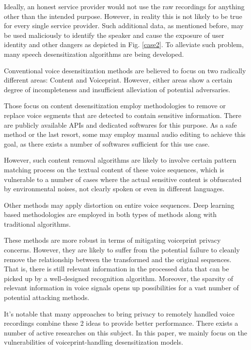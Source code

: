 \documentclass[journal]{IEEEtran} %
\begin{document}
Ideally, an honest service provider would not use the raw recordings for anything other than the intended purpose. However, in reality this is not likely to be true for every single service provider. Such additional data, as mentioned before, may be used maliciously to identify the speaker and cause the exposure of user identity and other dangers as depicted in Fig. \ref{case2}. To alleviate such problem, many speech desensitization algorithms are being developed.

Conventional voice desensitization methods are believed to focus on two radically different areas: Content and Voiceprint. However, either areas show a certain degree of incompleteness and insufficient alleviation of potential adversaries.

Those focus on content desensitization employ methodologies to remove or replace voice segments that are detected to contain sensitive information. There are publicly available APIs\cite{a13} and dedicated softwares for this purpose\cite{a14}. As a safe method or the last resort, some may employ manual audio editing to achieve this goal, as there exists a number of softwares sufficient for this use case\cite{a15}.

However, such content removal algorithms are likely to involve certain pattern matching process on the textual content of these voice sequences, which is vulnerable to a number of cases where the actual sensitive content is obfuscated by environmental noises, not clearly spoken or even in different languages.

Other methods may apply distortion on entire voice sequences. Deep learning based methodologies are employed in both types of methods along with traditional algorithms\cite{a9, a10, a11}.

These methods are more robust in terms of mitigating voiceprint privacy concerns. However, they are likely to suffer from the potential failure to cleanly remove the relationship between the transformed and the original sequences. That is, there is still relevant information in the processed data that can be picked up by a well-designed recognition algorithm. Moreover, the sparsity of relevant information in voice signals opens up possibilities for a vast number of potential attacking methods.

It's notable that many approaches to bring privacy to remotely handled voice recordings combine these 2 ideas to provide better performance. There exists a number of active researches on this subject\cite{a8}. In this paper, we mainly focus on the vulnerabilities of voiceprint-handling desensitization models.
\end{document}

